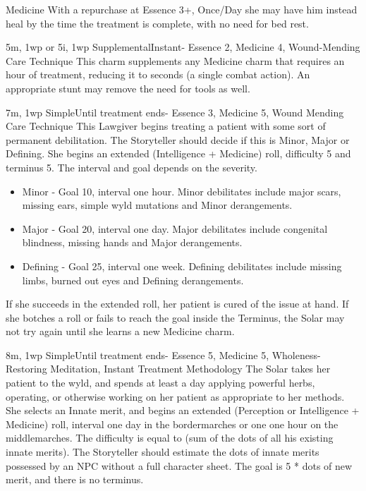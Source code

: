 \begin{Ability}{Medicine}
  With a repurchase at Essence 3+, Once/Day she may have him instead heal by the time the treatment is complete, with no need for bed rest.

  {5m, 1wp or 5i, 1wp}
  {Supplemental}{Instant}{-}
  {Essence 2, Medicine 4, Wound-Mending Care Technique}
  This charm supplements any Medicine charm that requires an hour of treatment, reducing it to seconds (a single combat action). An appropriate stunt may remove the need for tools as well.

  {7m, 1wp}
  {Simple}{Until treatment ends}{-}
  {Essence 3, Medicine 5, Wound Mending Care Technique}
  This Lawgiver begins treating a patient with some sort of permanent debilitation. The Storyteller should decide if this is Minor, Major or Defining. She begins an extended (Intelligence + Medicine) roll, difficulty 5 and terminus 5. The interval and goal depends on the severity.

  \begin{itemize}
    \item Minor - Goal 10, interval one hour. Minor debilitates include major scars, missing ears, simple wyld mutations and Minor derangements.
    \item Major - Goal 20, interval one day. Major debilitates include congenital blindness, missing hands and Major derangements.
    \item Defining - Goal 25, interval one week. Defining debilitates include missing limbs, burned out eyes and Defining derangements.
  \end{itemize}

  If she succeeds in the extended roll, her patient is cured of the issue at hand. If she botches a roll or fails to reach the goal inside the Terminus, the Solar may not try again until she learns a new Medicine charm.

  {8m, 1wp}
  {Simple}{Until treatment ends}{-}
  {Essence 5, Medicine 5, Wholeness-Restoring Meditation, Instant Treatment Methodology}
  The Solar takes her patient to the wyld, and spends at least a day applying powerful herbs, operating, or otherwise working on her patient as appropriate to her methods. She selects an Innate merit, and begins an extended (Perception or Intelligence + Medicine) roll, interval one day in the bordermarches or one one hour on the middlemarches. The difficulty is equal to (sum of the dots of all his existing innate merits). The Storyteller should estimate the dots of innate merits possessed by an NPC without a full character sheet. The goal is 5 * dots of new merit, and there is no terminus.


\end{Ability}

